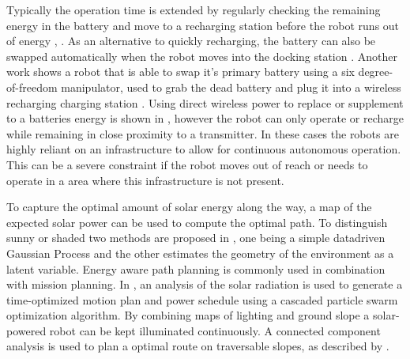 \documentclass[letterpaper, 10 pt, conference]{ieeeconf}  %
\begin{document}

Typically the operation time is extended by regularly checking the remaining energy in the battery and move to a recharging station before the robot runs out of energy \cite{pickem_icra_2015}, \cite{rubenstein_icra_2012}.
As an alternative to quickly recharging, the battery can also be swapped automatically when the robot moves into the docking station \cite{kemal_mech_2015}.
Another work shows a robot that is able to swap it's primary battery using a six degree-of-freedom manipulator, used to grab the dead battery and plug it into a wireless recharging charging station \cite{zhang_conel_2013}.
Using direct wireless power to replace or supplement to a batteries energy is shown in \cite{karpelson_icra_2014}, however the robot can only operate or recharge while remaining in close proximity to a transmitter. 
In these cases the robots are highly reliant on an infrastructure to allow for continuous autonomous operation.
This can be a severe constraint if the robot moves out of reach or needs to operate in a area where this infrastructure is not present.



To capture the optimal amount of solar energy along the way, a map of the expected solar power can be used to compute the optimal path. To distinguish sunny or shaded two methods are proposed in \cite{plonski_tranro_2016}, one being a simple datadriven Gaussian Process and the other estimates the geometry of the environment as a latent variable.
Energy aware path planning is commonly used in combination with mission planning.
In \cite{kaplan_iros_2016}, an analysis of the solar radiation is used to generate a time-optimized motion plan and power schedule using a cascaded particle swarm optimization algorithm.
By combining maps of lighting and ground slope a solar-powered robot can be kept illuminated continuously. A connected component analysis is used to plan a optimal route on traversable slopes, as described by \cite{otten_icra_2015}.


% 
\end{document}
